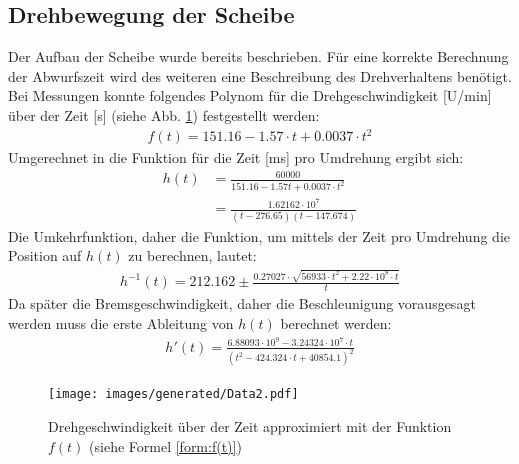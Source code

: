 \subsection{Drehbewegung der Scheibe}
Der Aufbau der Scheibe wurde bereits beschrieben.
Für eine korrekte Berechnung der Abwurfszeit wird des weiteren eine Beschreibung des Drehverhaltens benötigt.
Bei Messungen konnte folgendes Polynom für die Drehgeschwindigkeit [U/min] über der Zeit [s] (siehe Abb. \ref{img:drehgeschw}) festgestellt werden:
\begin{align}
	f(t) = 151.16 - 1.57 \cdot t + 0.0037 \cdot t^2 \label{form:f(t)}
\end{align}
Umgerechnet in die Funktion für die Zeit [ms] pro Umdrehung ergibt sich:
\begin{align}
	h(t) 	&= \frac{60000}{151.16 - 1.57t + 0.0037 \cdot t^2} \\
	    	&= \frac{1.62162\cdot 10^7}{(t-276.65) (t-147.674)} \label{form:h(t)}
\end{align}
Die Umkehrfunktion, daher die Funktion, um mittels der Zeit pro Umdrehung die Position auf $h(t)$ zu berechnen, lautet:
\begin{align}
	h^{-1}(t) 	= 212.162 \pm \frac{0.27027 \cdot \sqrt{56933\cdot t^2 + 2.22\cdot 10^8 \cdot t}}{t} \label{form:h-1(t)}
\end{align}
Da später die Bremsgeschwindigkeit, daher die Beschleunigung vorausgesagt werden muss die erste Ableitung von $h(t)$ berechnet werden:
\begin{align}
	h'(t) 	= \frac{6.88093\cdot 10^9 - 3.24324 \cdot 10^7 \cdot t}{(t^2 - 424.324\cdot t + 40854.1)^2} \label{form:h'(t)}
\end{align}

\begin{figure}[hb] \centering
	\texttt{[image: images/generated/Data2.pdf]}
	\caption{Drehgeschwindigkeit über der Zeit approximiert mit der Funktion $f(t)$ (siehe Formel \ref{form:f(t)})}
	\label{img:drehgeschw}
\end{figure}

